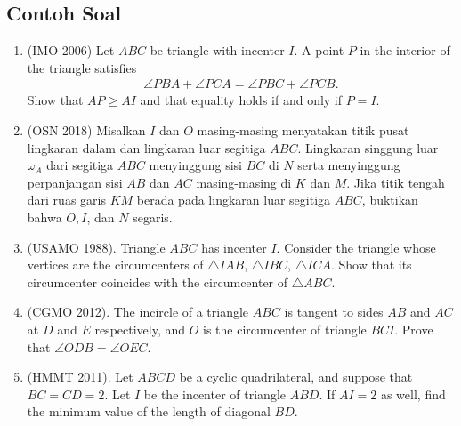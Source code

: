 \documentclass[11pt]{scrartcl}
\begin{document}
\subsection{Contoh Soal}
\begin{enumerate}
\item (IMO 2006) Let $ABC$ be triangle with incenter $I$. A point $P$ in the interior of the triangle satisfies
\begin{align*}
    \angle PBA + \angle PCA = \angle PBC + \angle PCB.
\end{align*}
Show that $AP \ge AI$ and that equality holds if and only if $P=I$.

\item (OSN 2018) Misalkan $I$ dan $O$ masing-masing menyatakan titik pusat lingkaran dalam dan lingkaran luar segitiga $ABC$. Lingkaran singgung luar $\omega_A$ dari segitiga $ABC$ menyinggung sisi $BC$ di $N$ serta menyinggung perpanjangan sisi $AB$ dan $AC$ masing-masing di $K$ dan $M$. Jika titik tengah dari ruas garis $KM$ berada pada lingkaran luar segitiga $ABC$, buktikan bahwa $O,I$, dan $N$ segaris.

\item (USAMO 1988). Triangle $ABC$ has incenter $I$. Consider the triangle whose vertices are the circumcenters of $\triangle IAB$, $\triangle IBC$, $\triangle ICA$. Show that its circumcenter coincides with the circumcenter of $\triangle ABC$.

\item (CGMO 2012). The incircle of a triangle $ABC$ is tangent to sides $AB$ and $AC$ at $D$ and $E$ respectively, and $O$ is the circumcenter of triangle $BCI$. Prove that $\angle ODB = \angle OEC$.

\item (HMMT 2011). Let $ABCD$ be a cyclic quadrilateral, and suppose that $BC = CD = 2$. Let $I$ be the incenter of triangle $ABD$. If $AI = 2$ as well, find the minimum value of the length of diagonal $BD$.

\end{enumerate}
\end{document}
